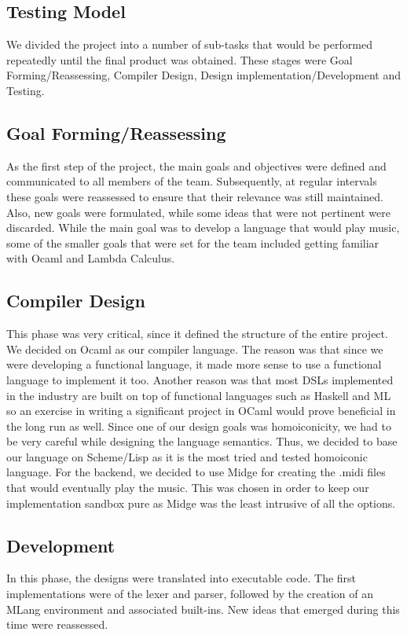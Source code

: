 \documentclass[letterpaper,11pt]{article}
\begin{document}
{\subsection{Testing Model}
We divided the project into a number of sub-tasks that would be performed repeatedly until the final product was obtained. These stages were
Goal Forming/Reassessing, Compiler Design, Design implementation/Development and Testing.

\subsection{Goal Forming/Reassessing}
As the first step of the project, the main goals and objectives were defined and communicated to all members of the team. Subsequently, at regular intervals these goals were reassessed to ensure that their relevance was still maintained. Also, new goals were formulated, while some ideas that were not pertinent were discarded. While the main goal was to develop a language that would play music, some of the smaller goals that were set for the team included getting familiar with Ocaml and Lambda Calculus.

 \subsection{Compiler Design}
This phase was very critical, since it defined the structure of the entire project. We decided on Ocaml as our compiler language. The reason was
that since we were developing a functional language, it made more sense to use a functional language to implement it too. Another reason was that
most DSLs implemented in the industry are built on top of functional languages such as Haskell and ML so an exercise in writing a significant
project in OCaml would prove beneficial in the long run as well.
Since one of our design goals was homoiconicity, we had to be very careful while designing the language semantics. Thus, we decided to base our
language on Scheme/Lisp as it is the most tried and tested homoiconic language. 
For the backend, we decided to use Midge for creating the .midi files that would eventually play the music. This was chosen in order to keep our
implementation sandbox pure as Midge was the least intrusive of all the options.

 \subsection{Development}
In this phase, the designs were translated into executable code. The first implementations were of the lexer and parser, followed by the creation of an MLang environment and associated built-ins. New ideas that emerged during this time were reassessed.

}
\end{document}
